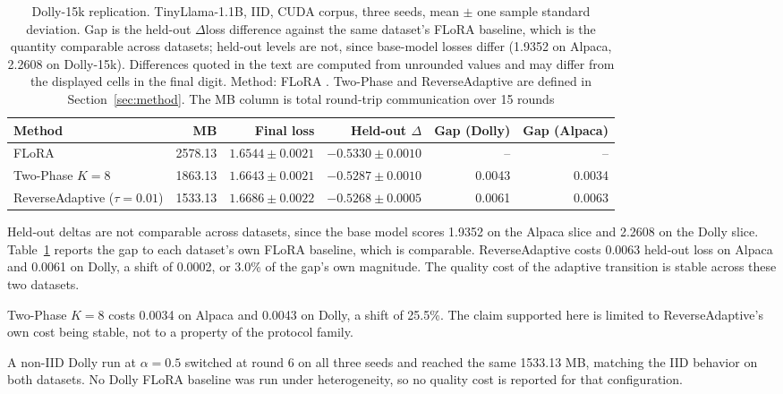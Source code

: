 \begin{table}[tbp]
\centering
\footnotesize
\setlength{\tabcolsep}{6pt}
\caption{Dolly-15k replication. TinyLlama-1.1B, IID, CUDA corpus, three seeds, mean $\pm$ one sample standard deviation. Gap is the held-out $\Delta$loss difference against the same dataset's FLoRA baseline, which is the quantity comparable across datasets; held-out levels are not, since base-model losses differ (1.9352 on Alpaca, 2.2608 on Dolly-15k). Differences quoted in the text are computed from unrounded values and may differ from the displayed cells in the final digit. Method: FLoRA \cite{wang2024flora}. Two-Phase and ReverseAdaptive are defined in Section~\ref{sec:method}. The MB column is total round-trip communication over 15 rounds}
\label{tab:dolly}
\begin{tabular}{@{}lrrrrr@{}}
\toprule
Method & MB & Final loss & Held-out $\Delta$ & Gap (Dolly) & Gap (Alpaca) \\
\midrule
FLoRA                           & 2578.13 & $1.6544 \pm 0.0021$ & $-0.5330 \pm 0.0010$ & -- & -- \\
Two-Phase $K{=}8$               & 1863.13 & $1.6643 \pm 0.0021$ & $-0.5287 \pm 0.0010$ & 0.0043 & 0.0034 \\
ReverseAdaptive ($\tau{=}0.01$) & 1533.13 & $1.6686 \pm 0.0022$ & $-0.5268 \pm 0.0005$ & 0.0061 & 0.0063 \\
\bottomrule
\end{tabular}
\end{table}

Held-out deltas are not comparable across datasets, since the base model scores 1.9352 on the Alpaca slice and 2.2608 on the Dolly slice. Table~\ref{tab:dolly} reports the gap to each dataset's own FLoRA baseline, which is comparable. ReverseAdaptive costs 0.0063 held-out loss on Alpaca and 0.0061 on Dolly, a shift of 0.0002, or 3.0\% of the gap's own magnitude. The quality cost of the adaptive transition is stable across these two datasets.

Two-Phase $K{=}8$ costs 0.0034 on Alpaca and 0.0043 on Dolly, a shift of 25.5\%. The claim supported here is limited to ReverseAdaptive's own cost being stable, not to a property of the protocol family.

A non-IID Dolly run at $\alpha{=}0.5$ switched at round 6 on all three seeds and reached the same 1533.13 MB, matching the IID behavior on both datasets. No Dolly FLoRA baseline was run under heterogeneity, so no quality cost is reported for that configuration.

